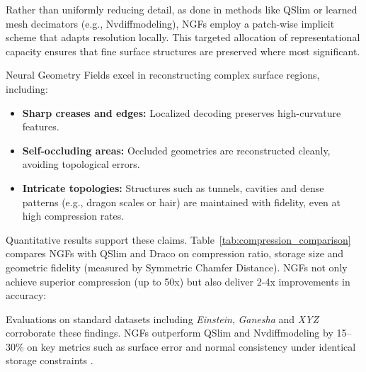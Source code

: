 Rather than uniformly reducing detail, as done in methods like QSlim or learned mesh decimators (e.g., Nvdiffmodeling), NGFs employ a patch-wise implicit scheme that adapts resolution locally. 
This targeted allocation of representational capacity ensures that fine surface structures are preserved where most significant. 

Neural Geometry Fields excel in reconstructing complex surface regions, including:
\begin{itemize}
    \item \textbf{Sharp creases and edges:} Localized decoding preserves high-curvature features.
    \item \textbf{Self-occluding areas:} Occluded geometries are reconstructed cleanly, avoiding topological errors.
    \item \textbf{Intricate topologies:} Structures such as tunnels, cavities and dense patterns (e.g., dragon scales or hair) are maintained with fidelity, even at high compression rates.
\end{itemize}

Quantitative results support these claims. 
Table~\ref{tab:compression_comparison} compares NGFs with QSlim and Draco on compression ratio, storage size and geometric fidelity (measured by Symmetric Chamfer Distance). 
NGFs not only achieve superior compression (up to 50x) but also deliver 2-4x improvements in accuracy: 

\begin{table}[h]
\caption{Comparison of compression efficiency and reconstruction fidelity across methods. Chamfer Distances are scaled by $10^5$ and normalized by the bounding box diagonal.}
\centering
{}
\label{tab:compression_comparison}
\end{table}

Evaluations on standard datasets including \textit{Einstein}, \textit{Ganesha} and \textit{XYZ} corroborate these findings. 
NGFs outperform QSlim and Nvdiffmodeling by 15--30\% on key metrics such as surface error and normal consistency under identical storage constraints \cite{sivaram2024}.

